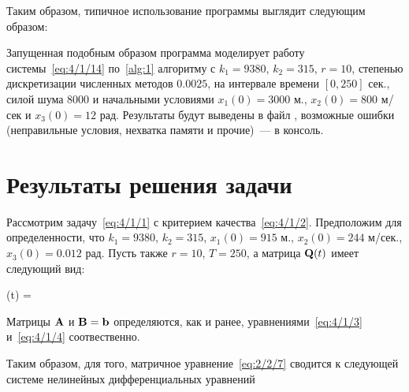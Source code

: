 Таким образом, типичное использование программы выглядит следующим образом:


Запущенная подобным образом программа моделирует работу системы~\vref{eq:4/1/14} по~\ref{alg:1} алгоритму с $k_1=9380$, $k_2=315$, $r=10$, степенью дискретизации численных методов $0.0025$, на интервале времени $[0, 250]$ сек., силой шума $8000$ и начальными условиями $x_1(0)=3000$ м., $x_2(0)=800$ м/сек и $x_3(0)=12$ рад. Результаты будут выведены в файл , возможные ошибки (неправильные условия, нехватка памяти и прочие)~--- в консоль.



\section{Результаты решения задачи}



Рассмотрим задачу~\vref{eq:4/1/1} с критерием качества~\vref{eq:4/1/2}. Предположим для определенности, что $k_1=9380$, $k_2=315$, $x_1(0)=915$ м., $x_2(0)=244$ м/сек., $x_3(0)=0.012$ рад. Пусть также $r=10$, $T=250$, а матрица $\mathbf{Q}(t)$ имеет следующий вид:

    (t) =   
\eeq

Матрицы $\mathbf{A}$ и $\mathbf{B} = \mathbf{b}$ определяются, как и ранее, уравнениями~\ref{eq:4/1/3} и~\vref{eq:4/1/4} соотвественно.

Таким образом, для того, матричное уравнение~\vref{eq:2/2/7} сводится к следующей системе нелинейных дифференциальных уравнений

